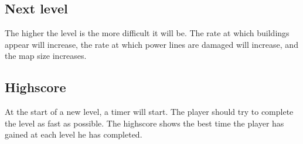 \subsection*{Next level}

	The higher the level is the more difficult it will be. The rate at which buildings appear 
	will increase, the rate at which power lines are damaged will increase, and the map size increases.

\subsection*{Highscore}

	At the start of a new level, a timer will start. The player should try to complete the level as 
	fast as possible. The highscore shows the best time the player has gained at each level he has completed.